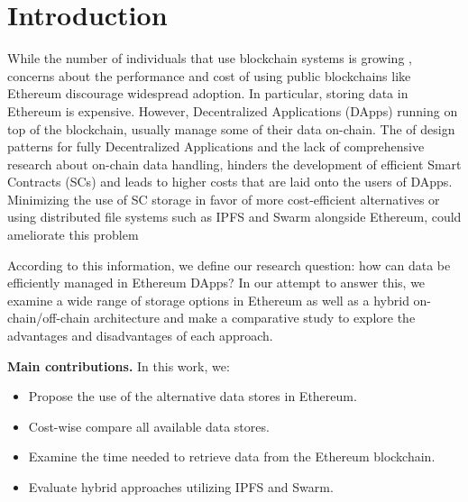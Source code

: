 \chapter{Introduction}\label{chapter:introduction}
While the number of individuals that use blockchain systems is growing , concerns about the performance and cost of using public blockchains like Ethereum \citep{buterin_2014} discourage widespread adoption. In particular, storing data in Ethereum is expensive. However, Decentralized Applications (DApps) running on top of the blockchain, usually manage some of their data on-chain. The  of design patterns for fully Decentralized Applications \citep{wohrer_2021} and the lack of comprehensive research about on-chain data handling, hinders the development of efficient Smart Contracts (SCs) and leads to higher costs that are laid onto the users of DApps. Minimizing the use of SC storage in favor of more cost-efficient alternatives or using distributed file systems such as IPFS \citep{benet_2014} and Swarm \citep{tron_2020} alongside Ethereum, could ameliorate this problem 

According to this information, we define our research question: how can data be efficiently managed in Ethereum DApps?
In our attempt to answer this, we examine a wide range of storage options in Ethereum as well as a hybrid on-chain/off-chain architecture and make a comparative study to explore the advantages and disadvantages of each approach. 

{\bf Main contributions.} In this work, we:
\begin{itemize}[topsep=0pt, itemsep=0pt]
\item{Propose the use of the alternative data stores in Ethereum.}
\item{Cost-wise compare all available data stores.}
\item{Examine the time needed to retrieve data from the Ethereum blockchain.}
\item{Evaluate hybrid approaches utilizing IPFS and Swarm.}
\end{itemize}

